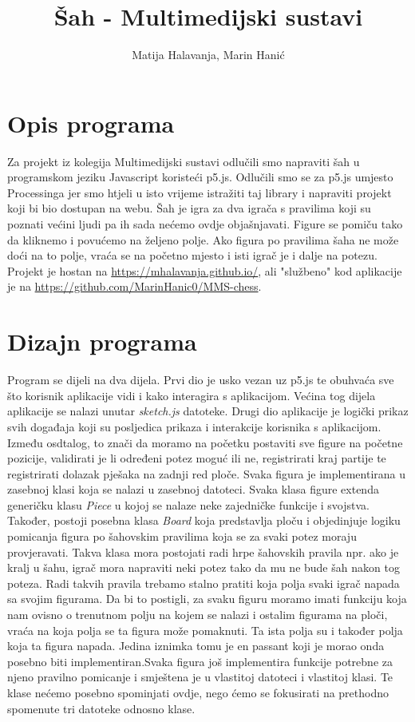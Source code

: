 \documentclass[11pt]{article}
\begin{document}
\author{Matija Halavanja, Marin Hanić}
\title{Šah - Multimedijski sustavi}
\maketitle
\tableofcontents

\section{Opis programa}
Za projekt iz kolegija Multimedijski sustavi odlučili smo napraviti šah u programskom jeziku Javascript koristeći p5.js.
Odlučili smo se za p5.js umjesto Processinga jer smo htjeli u isto vrijeme istražiti taj library i napraviti projekt koji
bi bio dostupan na webu. Šah je igra za dva igrača s pravilima koji su poznati većini ljudi pa ih sada nećemo ovdje objašnjavati.
Figure se pomiču tako da kliknemo i povućemo na željeno polje. Ako figura po pravilima šaha ne može doći na to polje, vraća se na
početno mjesto i isti igrač je i dalje na potezu. Projekt je hostan na \url{https://mhalavanja.github.io/}, ali "službeno" kod aplikacije je
na \url{https://github.com/MarinHanic0/MMS-chess}.

\section{Dizajn programa}
Program se dijeli na dva dijela. Prvi dio je usko vezan uz p5.js te obuhvaća sve što korisnik aplikacije vidi i kako
interagira s aplikacijom. Većina tog dijela aplikacije se nalazi unutar \textit{sketch.js} datoteke. Drugi dio aplikacije je logički prikaz
svih događaja koji su posljedica prikaza i interakcije korisnika s aplikacijom. Između osdtalog, to znači da moramo na početku 
postaviti sve figure na početne pozicije, validirati je li određeni potez moguć ili ne, registrirati kraj partije te
registrirati dolazak pješaka na zadnji red ploče. Svaka figura je implementirana u zasebnoj klasi koja se nalazi u zasebnoj datoteci.
Svaka klasa figure extenda generičku klasu \textit{Piece} u kojoj se nalaze neke zajedničke funkcije i svojstva. Također, postoji posebna
klasa \textit{Board} koja predstavlja ploču i objedinjuje logiku pomicanja figura po šahovskim pravilima koja se za svaki potez moraju
provjeravati. Takva klasa mora postojati radi hrpe šahovskih pravila npr. ako je kralj u šahu, igrač mora napraviti neki potez tako da mu ne
bude šah nakon tog poteza. Radi takvih pravila trebamo stalno pratiti koja polja svaki igrač napada sa svojim figurama. Da bi to postigli,
za svaku figuru moramo imati funkciju koja nam ovisno o trenutnom polju na kojem se nalazi i ostalim figurama na ploči, vraća na koja polja
se ta figura može pomaknuti. Ta ista polja su i također polja koja ta figura napada. Jedina iznimka tomu je en passant koji je morao onda posebno
biti implementiran.Svaka figura još implementira funkcije potrebne za njeno pravilno pomicanje i smještena je u vlastitoj datoteci i vlastitoj klasi.
Te klase nećemo posebno spominjati ovdje, nego ćemo se fokusirati na prethodno spomenute tri datoteke odnosno klase.
\end{document}
